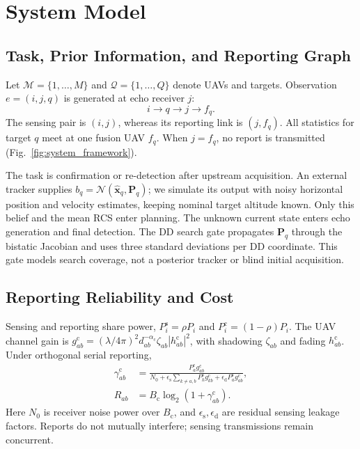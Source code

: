 \section{System Model}
\label{sec:system_model}


\subsection{Task, Prior Information, and Reporting Graph}

Let $\mathcal M=\{1,\ldots,M\}$ and $\mathcal Q=\{1,\ldots,Q\}$ denote
UAVs and targets. Observation $e=(i,j,q)$ is generated at echo receiver $j$:
\begin{equation}
 i\rightarrow q\rightarrow j\rightarrow f_q .
 \label{eq:information_path}
\end{equation}
The sensing pair is $(i,j)$, whereas its reporting link is $(j,f_q)$.
All statistics for target $q$ meet at one fusion UAV $f_q$.
When $j=f_q$, no report is transmitted (Fig.~\ref{fig:system_framework}).

The task is confirmation or re-detection after upstream acquisition.
An external tracker supplies $b_q=\mathcal N(\widehat{\mathbf x}_q,\mathbf P_q)$;
we simulate its output with noisy horizontal position and velocity estimates,
keeping nominal target altitude known. Only this belief and the mean RCS
enter planning. The unknown current state enters echo generation and final
detection. The DD search gate propagates $\mathbf P_q$ through the bistatic
Jacobian and uses three standard deviations per DD coordinate. This gate
models search coverage, not a posterior tracker or blind initial acquisition.

\subsection{Reporting Reliability and Cost}

Sensing and reporting share power, $P_i^{\mathrm s}=\rho P_i$ and
$P_i^{\mathrm c}=(1-\rho)P_i$. The UAV channel gain is
$g_{ab}^{\mathrm c}=(\lambda/4\pi)^2d_{ab}^{-\alpha_{\mathrm c}}
\zeta_{ab}|h_{ab}^{\mathrm c}|^2$, with shadowing $\zeta_{ab}$ and fading
$h_{ab}^{\mathrm c}$. Under orthogonal serial reporting,
\begin{equation}
\begin{aligned}
 \gamma_{ab}^{\mathrm c}&=
 \frac{P_a^{\mathrm c}g_{ab}^{\mathrm c}}
 {N_0+\epsilon_{\mathrm s}\sum_{k\ne a,b}P_k^{\mathrm s}g_{kb}^{\mathrm c}
 +\epsilon_{\mathrm d}P_a^{\mathrm s}g_{ab}^{\mathrm c}},\\
 R_{ab}&=B_{\mathrm c}\log_2(1+\gamma_{ab}^{\mathrm c}).
\end{aligned}
 \label{eq:comm_sinr_rate}
\end{equation}
Here $N_0$ is receiver noise power over $B_{\mathrm c}$, and
$\epsilon_{\mathrm s},\epsilon_{\mathrm d}$ are residual sensing leakage factors.
Reports do not mutually interfere; sensing transmissions remain concurrent.

